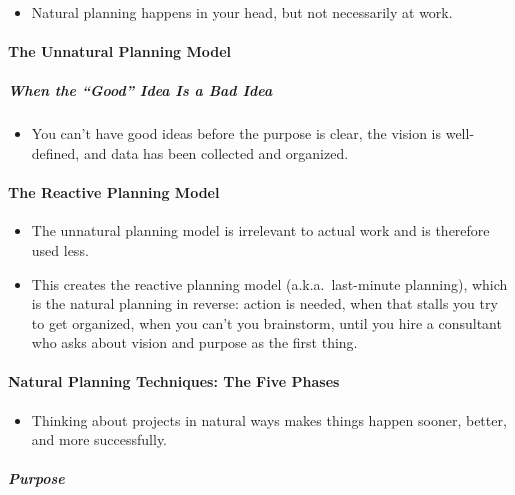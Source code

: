\documentclass{article}
\begin{document}
\begin{itemize}
  \item Natural planning happens in your head, but not necessarily at work.
\end{itemize}

\paragraph{The Unnatural Planning Model}

\subparagraph{When the ``Good'' Idea Is a Bad Idea}

\begin{itemize}
  \item You can't have good ideas before the purpose is clear, the vision is well-defined, and data has been collected and organized.
\end{itemize}

\paragraph{The Reactive Planning Model}

\begin{itemize}
  \item The unnatural planning model is irrelevant to actual work and is therefore used less.
  \item This creates the reactive planning model (a.k.a.\ last-minute planning), which is the natural planning in reverse: action is needed, when that stalls you try to get organized, when you can't you brainstorm, until you hire a consultant who asks about vision and purpose as the first thing.
\end{itemize}

\paragraph{Natural Planning Techniques: The Five Phases}

\begin{itemize}
  \item Thinking about projects in natural ways makes things happen sooner, better, and more successfully.
\end{itemize}

\subparagraph{Purpose}
\end{document}
